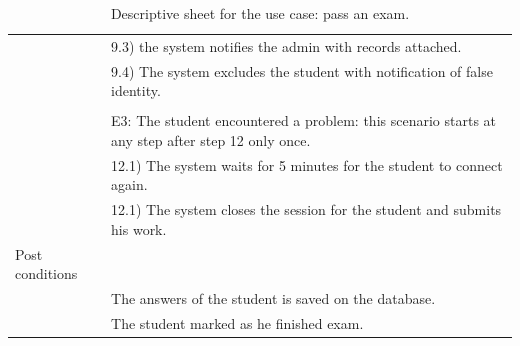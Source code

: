 \documentclass[]{uc2pfecaneva}
\begin{document}
\begin{table}[h]
\begin{tabularx}{\textwidth}{|l|X|}
		                      & \hspace{4mm}9.3) the system notifies the admin with records attached.                             \\
		                      & \hspace{4mm}9.4) The system excludes the student with notification of false identity.             \\
		                      &                                                                                                   \\
		                      & E3: The student encountered a problem: this scenario starts at any step after step 12 only once.  \\
		                      & \hspace{4mm}12.1) The system waits for 5 minutes for the student to connect again.                \\
		                      & \hspace{4mm}12.1) The system closes the session for the student and submits his work.             \\ \hline
		Post conditions       &                                                                                                   \\
		                      & The answers of the student is saved on the database.                                              \\
		                      & The student marked as he finished exam.                                                           \\ \hline
	\end{tabularx}
	\caption{Descriptive sheet for the use case: pass an exam.}
	\label{table:4}
\end{table}
\clearpage
\end{document}
